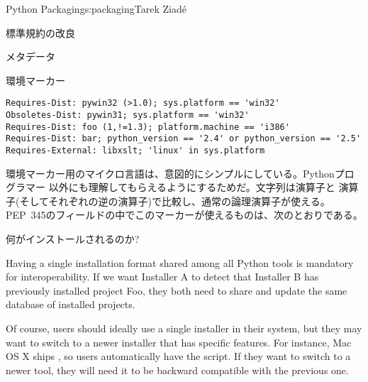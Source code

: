 \begin{aosachapter}{Python Packaging}{s:packaging}{Tarek Ziad\'{e}}
\begin{aosasect1}{標準規約の改良}
\begin{aosasect2}{メタデータ}
\begin{aosasect3}{環境マーカー}
\begin{verbatim}
Requires-Dist: pywin32 (>1.0); sys.platform == 'win32'
Obsoletes-Dist: pywin31; sys.platform == 'win32'
Requires-Dist: foo (1,!=1.3); platform.machine == 'i386'
Requires-Dist: bar; python_version == '2.4' or python_version == '2.5'
Requires-External: libxslt; 'linux' in sys.platform
\end{verbatim}

環境マーカー用のマイクロ言語は、意図的にシンプルにしている。Pythonプログラマー
以外にも理解してもらえるようにするためだ。文字列は\code{==}演算子と
演算子(そしてそれぞれの逆の演算子)で比較し、通常の論理演算子が使える。
PEP~345のフィールドの中でこのマーカーが使えるものは、次のとおりである。

\begin{aosaitemize}
  \item {}
  \item {}
  \item {}
  \item {}
  \item {}
  \item {}
\end{aosaitemize}

\end{aosasect3}

\end{aosasect2}

\begin{aosasect2}{何がインストールされるのか?}

Having a single installation format shared among all Python tools is
mandatory for interoperability. If we want Installer A to detect that
Installer B has previously installed project Foo, they both need to
share and update the same database of installed projects.

Of course, users should ideally use a single installer in their
system, but they may want to switch to a newer installer that has
specific features. For instance, Mac OS X ships , so
users automatically have the  script. If they
want to switch to a newer tool, they will need it to be backward
compatible with the previous one.


\end{aosasect2}
\end{aosasect1}
\end{aosachapter}
